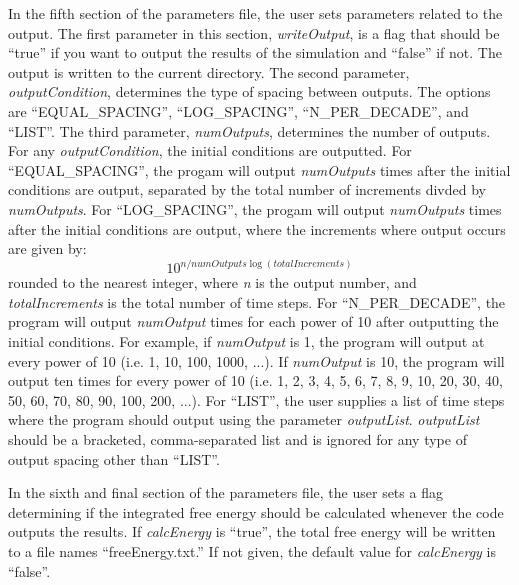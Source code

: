 \documentclass[10pt]{article} %
\begin{document}
In the fifth section of the parameters file, the user sets parameters related to the output. The first parameter in this section, \emph{writeOutput}, is a flag that should be ``true'' if you want to output the results of the simulation and ``false'' if not. The output is written to the current directory. The second parameter, \emph{outputCondition}, determines the type of spacing between outputs. The options are ``EQUAL\_SPACING'', ``LOG\_SPACING'',  ``N\_PER\_DECADE'', and ``LIST''. The third parameter, \emph{numOutputs}, determines the number of outputs. For any \emph{outputCondition}, the initial conditions are outputted. For ``EQUAL\_SPACING'', the progam will output \emph{numOutputs} times after the initial conditions are output, separated by the total number of increments divded by \emph{numOutputs}. For ``LOG\_SPACING'', the progam will output \emph{numOutputs} times after the initial conditions are output, where the increments where output occurs are given by:
\begin{equation}
10^{n/numOutputs \log(totalIncrements)}
\end{equation}
rounded to the nearest integer, where \emph{n} is the output number, and \emph{totalIncrements} is the total number of time steps. For ``N\_PER\_DECADE'', the program will output \emph{numOutput} times for each power of 10 after outputting the initial conditions. For example, if \emph{numOutput} is 1, the program will output at every power of 10 (i.e. 1, 10, 100, 1000, ...). If \emph{numOutput} is 10, the program will output ten times for every power of 10 (i.e. 1, 2, 3, 4, 5, 6, 7, 8, 9, 10, 20, 30, 40, 50, 60, 70, 80, 90, 100, 200, ...). For ``LIST'', the user supplies a list of time steps where the program should output using the parameter \emph{outputList}. \emph{outputList} should be a bracketed, comma-separated list and is ignored for any type of output spacing other than ``LIST''.

In the sixth and final section of the parameters file, the user sets a flag determining if the integrated free energy should be calculated whenever the code outputs the results. If \emph{calcEnergy} is ``true'', the total free energy will be written to a file names ``freeEnergy.txt.'' If not given, the default value for \emph{calcEnergy} is ``false''.
\end{document}
